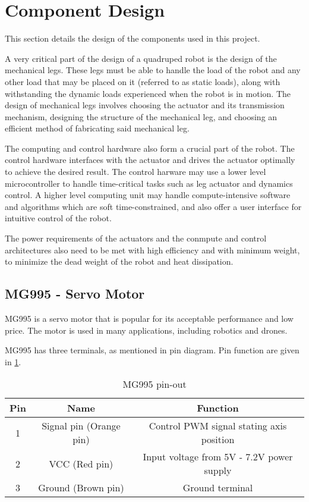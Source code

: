 \section{Component Design}

This section details the design of the components used in this project.

A very critical part of the design of a quadruped robot is the design of the mechanical legs. These legs must be able to handle the load of the robot and any other load that may be placed on it (referred to as static loads), along with withstanding the dynamic loads experienced when the robot is in motion. The design of mechanical legs involves choosing the actuator and its transmission mechanism, designing the structure of the mechanical leg, and choosing an efficient method of fabricating said mechanical leg.

The computing and control hardware also form a crucial part of the robot. The control hardware interfaces with the actuator and drives the actuator optimally to achieve the desired result. The control harware may use a lower level microcontroller to handle time-critical tasks such as leg actuator and dynamics control. A higher level computing unit may handle compute-intensive software and algorithms which are soft time-constrained, and also offer a user interface for intuitive control of the robot.

The power requirements of the actuators and the conmpute and control architectures also need to be met with high efficiency and with minimum weight, to minimize the dead weight of the robot and heat dissipation.


\subsection{MG995 - Servo Motor}
MG995 is a servo motor that is popular for its acceptable performance and low price. The motor is used in many applications, including robotics and drones.

MG995 has three terminals, as mentioned in pin diagram. Pin function are given in \ref{table:MG995PinOut}.

\begin{table}
\centering
    \begin{tabular}{ |c|c|c| } 
    \hline
    Pin & Name & Function\\
    \hline 
    1 & Signal pin (Orange pin) & Control PWM signal stating axis position \\
    2 & VCC (Red pin) & Input voltage from 5V - 7.2V power supply\\ 
    3 & Ground (Brown pin) & Ground terminal\\ 

    \hline
    \end{tabular}
    \caption{MG995 pin-out}
    \label{table:MG995PinOut}
\end{table}

